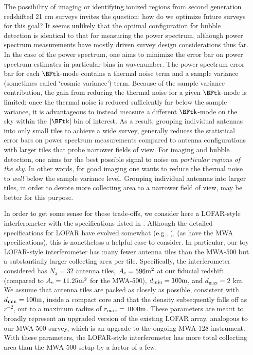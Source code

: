 The possibility of imaging or identifying ionized regions from second
generation redshifted 21 cm surveys invites the question: how do
we optimize future surveys for this goal? It seems unlikely that
the optimal configuration for bubble detection is identical to that
for measuring the power spectrum, although power spectrum measurements
have mostly driven survey design considerations thus far.
In the case of the power spectrum, one
aims to minimize the error bar on power spectrum estimates in 
particular bins in wavenumber. The power spectrum error bar for
each $\k$-mode contains a thermal noise term and a sample variance (sometimes
called `cosmic variance') term. Because of the sample variance contribution,
the gain from reducing the thermal noise for a given $\k$-mode is limited: once
the thermal noise is reduced sufficiently far below
the sample variance, it is advantageous to instead measure a different
$\k$-mode on the sky within the $|\k|$ bin of interest. As a result, grouping
individual antennas into only small tiles to achieve a wide survey, generally
reduces the statistical error bars on power spectrum measurements compared
to antenna configurations with larger tiles that probe narrower fields of view.
For imaging and bubble detection, one aims for the best possible
signal to noise on {\em particular regions of the sky}. In other words, for good
imaging one wants to reduce the thermal noise to {\em well} below the sample variance level.
Grouping individual antennas into larger tiles, in order
to devote more collecting area to a narrower field of view, may be better
for this purpose.

In order to get some sense for these trade-offs, we consider here
a LOFAR-style interferometer with the specifications
listed in \cite{McQuinn:2006et}. Although the detailed
specifications for LOFAR have evolved somewhat (e.g., \citealt{Zaroubi:2012cy}),
(as have the MWA specifications), this is nonetheless a helpful case to consider. In particular,
our toy LOFAR-style interferometer has many fewer antenna tiles than the
MWA-500 but a substantially larger collecting area per tile. Specifically, the interferometer
considered has $N_{\text{a}} =
32$ antenna tiles, $A_{\text{e}} = 596\meter^2$ at our fiducial redshift (compared
to $A_{\text{e}} = 11.25 \meter^2$ for the MWA-500), $d_{\min}
= 100\meter$, and $d_{\max} = 2$ km. We assume that antenna tiles are
packed as closely as possible, consistent with $d_{\min} = 100 \meter$,
inside a compact core and that the
density subsequently falls off as $r^{-2}$, out to a
maximum radius of $r_{\max} = 1000 \meter$. These parameters are
meant to broadly represent an upgraded version of the existing LOFAR array, analogous to our
MWA-500 survey, which is an upgrade to the ongoing MWA-128 instrument. With 
these parameters, the LOFAR-style interferometer has more total
collecting area than the MWA-500 setup by a factor of a
few. 

